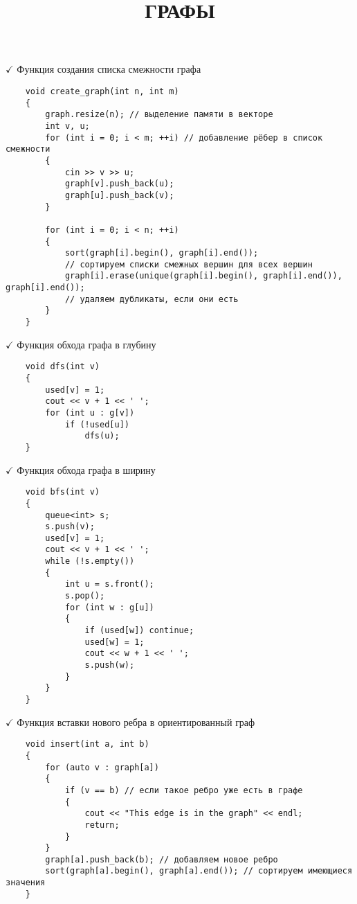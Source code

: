 \documentclass[a4paper, 14pt]{extarticle}
\author{}
\title{\MakeUppercase{Графы}}
\date{}
\begin{document}
\maketitle
\thispagestyle{empty}
\pagestyle{empty}

$\checkmark$ Функция создания списка смежности графа
\begin{verbatim}
    void create_graph(int n, int m)
    {
        graph.resize(n); // выделение памяти в векторе
        int v, u;
        for (int i = 0; i < m; ++i) // добавление рёбер в список смежности
        { 
            cin >> v >> u;
            graph[v].push_back(u);
            graph[u].push_back(v);
        }

        for (int i = 0; i < n; ++i) 
        {
            sort(graph[i].begin(), graph[i].end()); 
            // сортируем списки смежных вершин для всех вершин
            graph[i].erase(unique(graph[i].begin(), graph[i].end()), graph[i].end()); 
            // удаляем дубликаты, если они есть
        }
    }
\end{verbatim}

$\checkmark$ Функция обхода графа в глубину
\begin{verbatim}
    void dfs(int v)
    {
        used[v] = 1;
        cout << v + 1 << ' ';
        for (int u : g[v]) 
            if (!used[u]) 
                dfs(u);
    }
\end{verbatim}

$\checkmark$ Функция обхода графа в ширину
\begin{verbatim}
    void bfs(int v)
    {
        queue<int> s;
        s.push(v);
        used[v] = 1;
        cout << v + 1 << ' ';
        while (!s.empty())
        {
            int u = s.front();
            s.pop();
            for (int w : g[u])
            {
                if (used[w]) continue;
                used[w] = 1;
                cout << w + 1 << ' ';
                s.push(w);
            }
        }
    }
\end{verbatim}

$\checkmark$ Функция вставки нового ребра в ориентированный граф
\begin{verbatim}
    void insert(int a, int b)
    { 
        for (auto v : graph[a])
        {
            if (v == b) // если такое ребро уже есть в графе
            { 
                cout << "This edge is in the graph" << endl;
                return;
            }
        }
        graph[a].push_back(b); // добавляем новое ребро
        sort(graph[a].begin(), graph[a].end()); // сортируем имеющиеся значения
    }
\end{verbatim}
\end{document}

